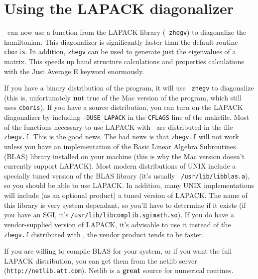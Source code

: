 \chapter{Using the LAPACK diagonalizer}

\calcprog\ can now use a function from the LAPACK library ({\tt
zhegv}) to diagonalize the hamiltonian.  This diagonalizer is
significantly faster than the default routine {\tt cboris}.  In
addition, {\tt zhegv} can be used to generate just the eigenvalues of
a matrix.  This speeds up band structure calculations and properties
calculations with the {\sf Just Average E} keyword enormously.  

If you have a binary distribution of the program, it will use {\tt
zhegv} to diagonalize (this is, unfortunately {\bf not} true of the
Mac version of the program, which still uses {\tt cboris}).  If you
have a source distribution, you can turn on the LAPACK diagonalizer by
including {\tt -DUSE\_LAPACK} in the {\tt CFLAGS} line of the
makefile.  Most of the functions necessary to use
LAPACK with \prog\ are distributed in the file {\tt zhegv.f}.
This is the good news.  
The bad news is that {\tt zhegv.f} will not work unless you
have an implementation of the Basic Linear Algebra Subroutines (BLAS)
library installed on your machine (this is why the Mac version doesn't
currently support LAPACK).  Most modern distributions of UNIX include
a specially tuned version of the BLAS library (it's usually {\tt
/usr/lib/libblas.a}), so you should be able to use LAPACK.  In
addition, many UNIX implementations will include (as an optional
product) a tuned version of LAPACK.  The name of this library is very
system dependant, so you'll have to determine if it exists (if you
have an SGI, it's {\tt /usr/lib/libcomplib.sgimath.so}).  If you do
have a vendor-supplied version of LAPACK, it's advisable to
use it instead of the {\tt zhegv.f} distributed with \prog, the
vendor product tends to be faster.

If you are willing to compile BLAS for your system, or if you want the
full LAPACK distribution, you can get them from the netlib server
({\tt http://netlib.att.com}).  Netlib is a {\bf great} source for
numerical routines.